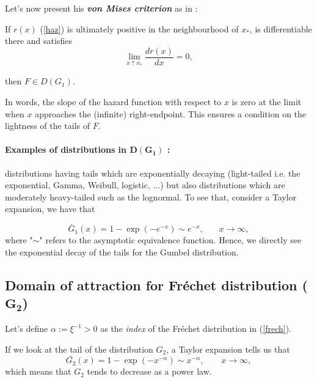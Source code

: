 Let's now present his \emph{\textbf{von Mises criterion}} as in \cite[pp.73]{beirlant_statistics_2006}: 
\begin{theorem} If $r(x)$ (\ref{haz})
is ultimately positive in the neighbourhood of $x_*$, is differentiable there and satisfies 
\begin{equation}
\displaystyle{\lim_{x  \uparrow  x_*}} \frac{dr(x)}{dx}=0,
\end{equation}

then $F\in D(G_1)$. %
\end{theorem}
In words, the slope of the hazard function with respect to $x$ is zero at the limit when $x$ approaches the (infinite) right-endpoint. This ensures a condition on the lightness of the tails of $F$.

\paragraph*{Examples of distributions in $\boldsymbol{D(G_1)}$ :} distributions having tails which are exponentially decaying (light-tailed i.e. the exponential, Gamma, Weibull, logistic, $\dots$) but also distributions which are moderately heavy-tailed such as the lognormal.
To see that, consider a Taylor expansion, we have that 

\begin{equation*}
\bar{G}_1(x)=1-\exp(-e^{-x})\sim e^{-x}, \ \ \ \ \ \ \ \ x\to\infty,
\end{equation*}
where "$\sim$" refers to the asymptotic equivalence function. Hence, we directly see the exponential decay of the tails for the Gumbel distribution.

\subsection*{Domain of attraction for Fréchet distribution ($\mathbf{G_{2}}$)}

Let's define $\alpha:=\xi^{-1}>0$ as the \emph{index} of the Fréchet distribution in (\ref{frech}).

\begin{definition}
If we look at the tail of the distribution $G_2$, a Taylor expansion tells us that
\begin{equation}\label{eq:powerlaw}
\bar{G_2}(x)=1-\exp (-x^{-\alpha})\sim x^{-\alpha}, \qquad x\to\infty, 
\end{equation}
which means that $G_2$ tends to decrease as a power law. 
\end{definition}


